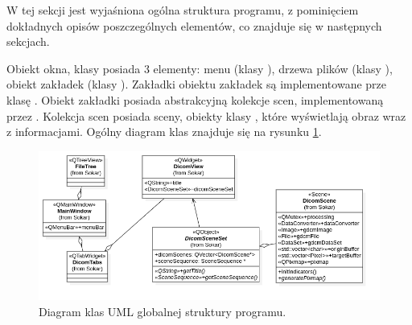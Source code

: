 
\par
W tej sekcji jest wyjaśniona ogólna struktura programu, z pominięciem dokładnych opisów poszczególnych elementów, co znajduje się w następnych sekcjach.
\par
Obiekt okna, klasy  posiada 3 elementy: menu (klasy ), drzewa plików (klasy ), obiekt zakładek (klasy ).
Zakładki obiektu zakładek są implementowane prze klasę .
Obiekt zakładki posiada abstrakcyjną kolekcje scen, implementowaną przez .
Kolekcja scen posiada sceny, obiekty klasy , które wyświetlają obraz wraz z informacjami.
Ogólny diagram klas znajduje się na rysunku \ref{fig:uml-global-sturcture}.

\begin{figure}[!htbp]
    \centering
    \includegraphics[width=\textwidth]{img/uml/global-sturcture.png}
    \caption{Diagram klas UML globalnej struktury programu.}
    \label{fig:uml-global-sturcture}
\end{figure}
